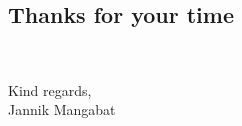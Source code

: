 \documentclass{article}
\begin{document}
\subsection*{Thanks for your time}
    \begin{spacing}{1.2}
        {\finalThankYou}\\        
    \end{spacing}
   



\noindent Kind regards,\\
    Jannik Mangabat
\end{document}
